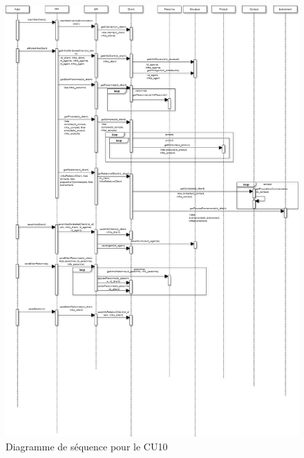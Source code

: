 \begin{figure}[H]
	\begin{center}
		\includegraphics[scale=0.4]{Includes/SOA-Sequence-CU10.png}
		\caption{Diagramme de séquence pour le CU10}
	\end{center}
\end{figure}
